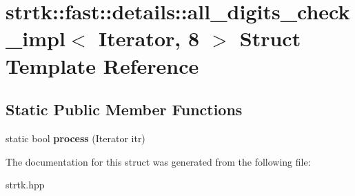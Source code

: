\hypertarget{structstrtk_1_1fast_1_1details_1_1all__digits__check__impl_3_01Iterator_00_018_01_4}{\section{strtk\-:\-:fast\-:\-:details\-:\-:all\-\_\-digits\-\_\-check\-\_\-impl$<$ Iterator, 8 $>$ Struct Template Reference}
\label{structstrtk_1_1fast_1_1details_1_1all__digits__check__impl_3_01Iterator_00_018_01_4}
}
\subsection*{Static Public Member Functions}
\begin{DoxyCompactItemize}
\item 
\hypertarget{structstrtk_1_1fast_1_1details_1_1all__digits__check__impl_3_01Iterator_00_018_01_4_a545b97fe544fca4f08ec9c3866ecb02c}{static bool {\bfseries process} (Iterator itr)}\label{structstrtk_1_1fast_1_1details_1_1all__digits__check__impl_3_01Iterator_00_018_01_4_a545b97fe544fca4f08ec9c3866ecb02c}

\end{DoxyCompactItemize}


The documentation for this struct was generated from the following file\-:\begin{DoxyCompactItemize}
\item 
strtk.\-hpp\end{DoxyCompactItemize}
